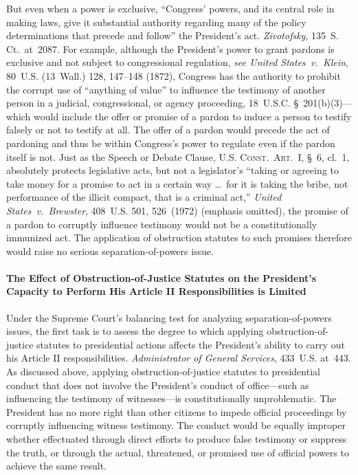 But even when a power is exclusive, ``Congress' powers, and its central role in making laws, give it substantial authority regarding many of the policy determinations that precede and follow'' the President's act.
\textit{Zivotofsky}, 135~S. Ct.~at~2087.
For example, although the President's power to grant pardons is exclusive and not subject to congressional regulation, \textit{see United States~v.\ Klein}, 80~U.S. (13~Wall.) 128, 147--148 (1872), Congress has the authority to prohibit the corrupt use of ``anything of value'' to influence the testimony of another person in a judicial, congressional, or agency proceeding, 18~U.S.C. \S~201(b)(3)---which would include the offer or promise of a pardon to induce a person to testify falsely or not to testify at all.
The offer of a pardon would precede the act of pardoning and thus be within Congress's power to regulate even if the pardon itself is not.
Just as the Speech or Debate Clause, \textsc{U.S. Const.\ Art.~I}, \S~6, cl.~1, absolutely protects legislative acts, but not a legislator's ``taking or agreeing to take money for a promise to act in a certain way \dots\ for it is taking the bribe, not performance of the illicit compact, that is a criminal act,'' \textit{United States~v.\ Brewster}, 408~U.S. 501, 526~(1972) (emphasis omitted), the promise of a pardon to corruptly influence testimony would not be a constitutionally immunized act.
The application of obstruction statutes to such promises therefore would raise no serious separation-of-powers issue.

\paragraph{The Effect of Obstruction-of-Justice Statutes on the President's Capacity to Perform His Article II Responsibilities is Limited}

Under the Supreme Court's balancing test for analyzing separation-of-powers issues, the first task is to assess the degree to which applying obstruction-of-justice statutes to presidential actions affects the President's ability to carry out his Article II responsibilities.
\textit{Administrator of General Services}, 433~U.S. at~443.
As discussed above, applying obstruction-of-justice statutes to presidential conduct that does not involve the President's conduct of office---such as influencing the testimony of witnesses---is constitutionally unproblematic.
The President has no more right than other citizens to impede official proceedings by corruptly influencing witness testimony.
The conduct would be equally improper whether effectuated through direct efforts to produce false testimony or suppress the truth, or through the actual, threatened, or promised use of official powers to achieve the same result.

